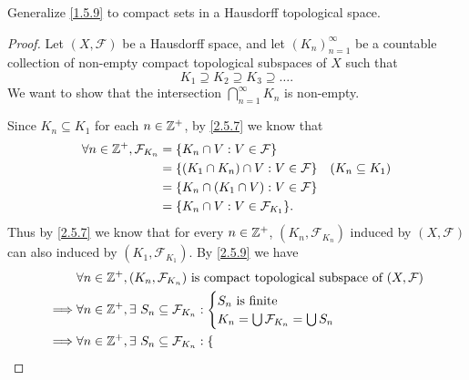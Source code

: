\begin{ex}\label{ex:2.5.13}
  Generalize \cref{1.5.9} to compact sets in a Hausdorff topological space.
\end{ex}

\begin{proof}
  Let \((X, \mathcal{F})\) be a Hausdorff space, and let \((K_n)_{n = 1}^\infty\) be a countable collection of non-empty compact topological subspaces of \(X\) such that
  \[
    K_1 \supseteq K_2 \supseteq K_3 \supseteq \dots.
  \]
  We want to show that the intersection \(\bigcap_{n = 1}^\infty K_n\) is non-empty.

  Since \(K_n \subseteq K_1\) for each \(n \in \mathbb{Z}^+\), by \cref{2.5.7} we know that
  \begin{align*}
    \forall n \in \mathbb{Z}^+, \mathcal{F}_{K_n} & = \{K_n \cap V : V \in \mathcal{F}\}                                  \\
                                          & = \{(K_1 \cap K_n) \cap V : V \in \mathcal{F}\} & (K_n \subseteq K_1) \\
                                          & = \{K_n \cap (K_1 \cap V) : V \in \mathcal{F}\}                       \\
                                          & = \{K_n \cap V : V \in \mathcal{F}_{K_1}\}.
  \end{align*}
  Thus by \cref{2.5.7} we know that for every \(n \in \mathbb{Z}^+\), \((K_n, \mathcal{F}_{K_n})\) induced by \((X, \mathcal{F})\) can also induced by \((K_1, \mathcal{F}_{K_1})\).
  By \cref{2.5.9} we have
  \begin{align*}
             & \forall n \in \mathbb{Z}^+, (K_n, \mathcal{F}_{K_n}) \text{ is compact topological subspace of } (X, \mathcal{F})                                                                \\
    \implies & \forall n \in \mathbb{Z}^+, \exists\ S_n \subseteq \mathcal{F}_{K_n} : \begin{cases}
                                                                                S_n \text{ is finite} \\
                                                                                K_n = \bigcup \mathcal{F}_{K_n} = \bigcup S_n
                                                                              \end{cases}                                                              \\
    \implies & \forall n \in \mathbb{Z}^+, \exists\ S_n \subseteq \mathcal{F}_{K_n} : \begin{cases}

\end{cases}
\end{align*}
\end{proof}
